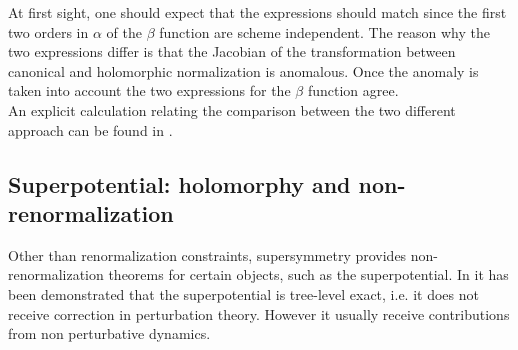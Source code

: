 At first sight, one should expect that the expressions should match since the first two orders in $\alpha$ of the $\beta$ function are scheme independent. 
The reason why the two expressions differ is that the Jacobian of the transformation between canonical and holomorphic normalization is anomalous. 
Once the anomaly is taken into account the two expressions for the $\beta$ function agree. \\
An explicit calculation relating the comparison between the two different approach can be found in \cite{ArkaniHamed:1997mj}.



















\subsection{Superpotential: holomorphy and non-renormalization}
\label{sec:superpotential_hol_renorm}
Other than renormalization constraints, supersymmetry provides non-renormalization theorems for certain objects, such as the superpotential.
In \cite{Grisaru:1979wc} it has been demonstrated that the superpotential is tree-level exact, i.e. it does not receive correction in perturbation theory. 
However it usually receive contributions from non perturbative dynamics.

